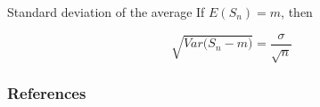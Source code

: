 \documentclass[usenames,dvipsnames]{beamer}
\begin{document}
\begin{frame}{Standard deviation of the average}
    If $E(S_n)=m$, then

    
    \begin{equation}
	\sqrt{Var\Big( S_n-m \Big)} = \frac{\sigma}{ \sqrt{n} } 
    \end{equation}
\end{frame}


\begin{frame}[allowframebreaks]
\frametitle{References}

 
\end{frame}
\end{document}
